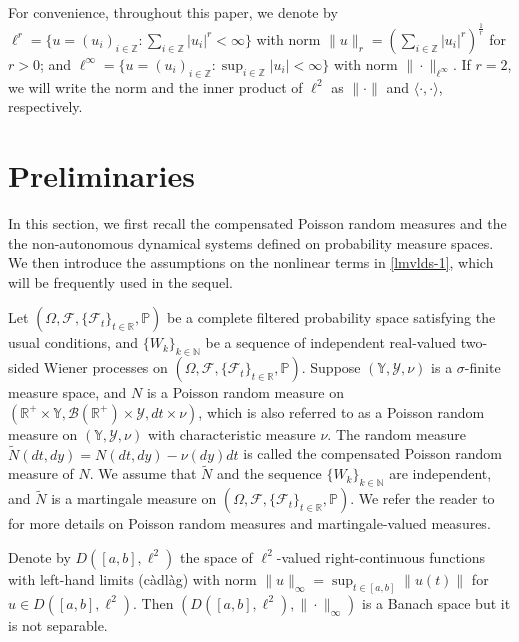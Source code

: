 \documentclass[11pt]{article}
\numberwithin{equation}{section}
\theoremstyle{plain}
\begin{document}
 For convenience, throughout this paper, we denote by
 $ \ell^r =  \{ u = (u_i)_{i \in \mathbb{Z} } : \sum\limits_{i \in \mathbb{Z}} |u_i|^r < \infty  \}$
  with   norm $\|u\|_r =  ( \sum\limits_{i \in \mathbb{Z}} |u_i|^r  )^{ \frac{1}{r}
 }$ for  $r>0$; and 
  $\ell^\infty =  \{ u = (u_i)_{i \in \mathbb{Z} } : \sup_{i \in \mathbb{Z}} |u_i| <  \infty  \}$
  with norm
   $\|\cdot\|_{\ell^\infty}$.
  If $r = 2$, we
  will write  the norm and the inner product of $\ell^2$ 
  as  $\|\cdot\|$ and $\langle \cdot, \cdot \rangle$, respectively.
 

 
 
 

 


\section{Preliminaries}\label{2}

 In this section, we first recall
 the  compensated Poisson random measures and  the the non-autonomous
 dynamical systems
 defined on probability measure spaces.
 We then introduce the assumptions on 
 the nonlinear terms   in \eqref{lmvlds-1},
 which will be frequently used in the sequel.
 
Let  $(\Omega, \mathcal{F}, \{\mathcal{F}_t\}_{t \in \mathbb{R}}, \mathbb{P})$
be a
  complete filtered probability space
  satisfying the usual conditions, and 
 $\{W_k\}_{k \in \mathbb{N}}$
 be  a sequence of independent real-valued two-sided Wiener processes
 on  $(\Omega, \mathcal{F}, \{\mathcal{F}_t\}_{t \in \mathbb{R}}, \mathbb{P})$.
 Suppose $(\mathbb{Y}, \mathcal{Y}, \nu)$ is a $\sigma$-finite measure space,
 and $N$ is a Poisson random measure on 
 $(\mathbb{R}^+ \times \mathbb{Y}, \mathcal{B} (\mathbb{R}^+) \times \mathcal{Y},  
 dt \times \nu)$,
  which is also referred to as a Poisson random measure on
  $( \mathbb{Y},  \mathcal{Y}, \nu)$ with characteristic measure $\nu$.
   The random measure
    $\widetilde{N} (dt, dy)
      = {N} (dt, dy) -\nu (dy) dt$
  is called the compensated Poisson random measure of $N$.
  We assume that
  $\widetilde{N} $
  and the sequence $\{W_k\}_{k\in \mathbb{N}}$ are independent, 
  and $\widetilde{N} $ is a martingale measure on 
   $(\Omega, \mathcal{F}, \{\mathcal{F}_t\}_{t \in \mathbb{R}}, \mathbb{P})$. 
 We refer the reader to \cite{APPL2009} for more details on Poisson random measures and 
 martingale-valued measures.
 
      
 Denote by $   D([a,b], \ell^2) $
 the space of $ \ell^2 $-valued right-continuous functions with left-hand limits (c\`{a}dl\`{a}g)
with norm
$\|u\|_{\infty} = \sup_{t \in [a,b]} \|u(t)\| $ for $ u \in    D([a,b], \ell^2) $.
 Then  $ (  D([a,b], \ell^2), \|\cdot\|_{\infty}) $ is a  Banach space  but  it is not separable.
 
\end{document}
